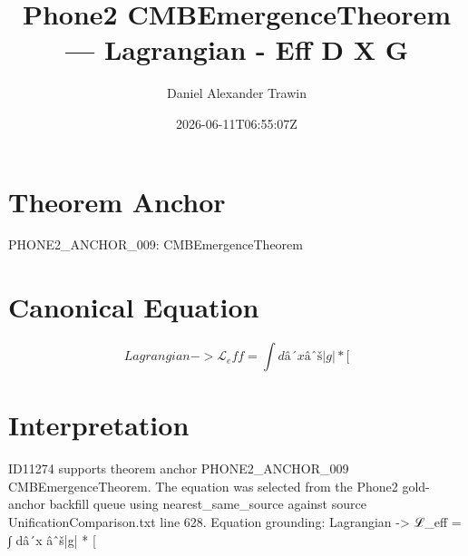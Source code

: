 \documentclass[11pt]{article}
\title{Phone2 CMBEmergenceTheorem — Lagrangian - Eff D X G}
\author{Daniel Alexander Trawin}
\date{2026-06-11T06:55:07Z}
\begin{document}
\maketitle
\section*{Theorem Anchor}
PHONE2_ANCHOR_009: CMBEmergenceTheorem
\section*{Canonical Equation}
\[
Lagrangian -> ℒ_eff = ∫ dâ´x âˆš|g| * [
\]
\section*{Interpretation}
ID11274 supports theorem anchor PHONE2_ANCHOR_009 CMBEmergenceTheorem. The equation was selected from the Phone2 gold-anchor backfill queue using nearest_same_source against source UnificationComparison.txt line 628. Equation grounding: Lagrangian -> ℒ_eff = ∫ dâ´x âˆš|g| * [
\end{document}
